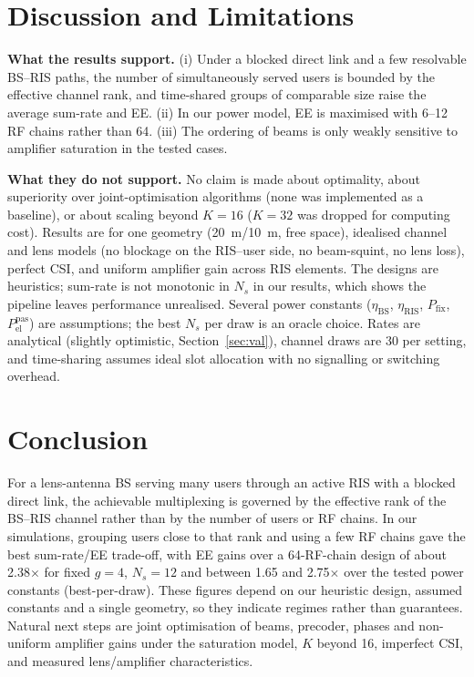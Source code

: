 \documentclass{ieeeaccess}
\begin{document}
\section{Discussion and Limitations}\label{sec:lim}
\textbf{What the results support.} (i) Under a blocked direct link and a few resolvable BS--RIS paths, the number of simultaneously served users is bounded by the effective channel rank, and time-shared groups of comparable size raise the average sum-rate and EE. (ii) In our power model, EE is maximised with 6--12 RF chains rather than 64. (iii) The ordering of beams is only weakly sensitive to amplifier saturation in the tested cases.

\textbf{What they do not support.} No claim is made about optimality, about superiority over joint-optimisation algorithms (none was implemented as a baseline), or about scaling beyond $K=16$ ($K=32$ was dropped for computing cost). Results are for one geometry (20~m/10~m, free space), idealised channel and lens models (no blockage on the RIS--user side, no beam-squint, no lens loss), perfect CSI, and uniform amplifier gain across RIS elements. The designs are heuristics; sum-rate is not monotonic in $N_s$ in our results, which shows the pipeline leaves performance unrealised. Several power constants ($\eta_\mathrm{BS}$, $\eta_\mathrm{RIS}$, $P_\mathrm{fix}$, $P_\mathrm{el}^\mathrm{pas}$) are assumptions; the best $N_s$ per draw is an oracle choice. Rates are analytical (slightly optimistic, Section~\ref{sec:val}), channel draws are 30 per setting, and time-sharing assumes ideal slot allocation with no signalling or switching overhead.

\section{Conclusion}
For a lens-antenna BS serving many users through an active RIS with a blocked direct link, the achievable multiplexing is governed by the effective rank of the BS--RIS channel rather than by the number of users or RF chains. In our simulations, grouping users close to that rank and using a few RF chains gave the best sum-rate/EE trade-off, with EE gains over a 64-RF-chain design of about 2.38$\times$ for fixed $g=4$, $N_s=12$ and between 1.65 and 2.75$\times$ over the tested power constants (best-per-draw). These figures depend on our heuristic design, assumed constants and a single geometry, so they indicate regimes rather than guarantees. Natural next steps are joint optimisation of beams, precoder, phases and non-uniform amplifier gains under the saturation model, $K$ beyond 16, imperfect CSI, and measured lens/amplifier characteristics.
\end{document}
